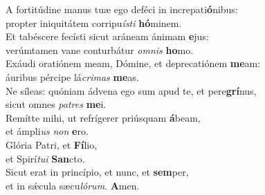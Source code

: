 \evenverse A fortitúdine manus tuæ ego deféci in increpati\textbf{ó}nibus:~\*\\
\evenverse propter iniquitátem corripu\textit{í}\textit{sti} \textbf{hó}minem.\\
\oddverse Et tabéscere fecísti sicut aráneam ánimam \textbf{e}jus:~\*\\
\oddverse verúmtamen vane conturbátur \textit{om}\textit{nis} \textbf{ho}mo.\\
\evenverse Exáudi oratiónem meam, Dómine, et deprecatiónem \textbf{me}am:~\*\\
\evenverse áuribus pércipe lá\textit{cri}\textit{mas} \textbf{me}as.\\
\oddverse Ne síleas: quóniam ádvena ego sum apud te, et pere\textbf{grí}nus,~\*\\
\oddverse sicut omnes \textit{pa}\textit{tres} \textbf{me}i.\\
\evenverse Remítte mihi, ut refrígerer priúsquam \textbf{á}beam,~\*\\
\evenverse et ámpli\textit{us} \textit{non} \textbf{e}ro.\\
\oddverse Glória Patri, et \textbf{Fí}lio,~\*\\
\oddverse et Spirí\textit{tu}\textit{i} \textbf{San}cto.\\
\evenverse Sicut erat in princípio, et nunc, et \textbf{sem}per,~\*\\
\evenverse et in sǽcula sæcu\textit{ló}\textit{rum}. \textbf{A}men.\\

